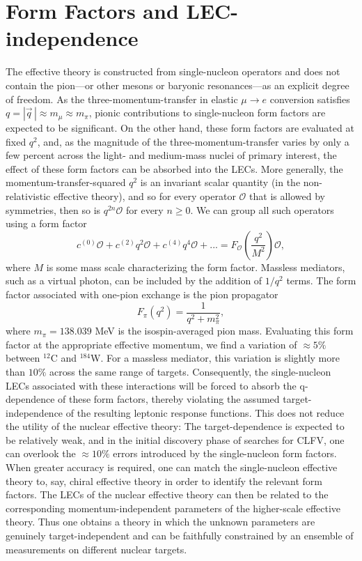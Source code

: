 \documentclass{book}[letterpaper,12pt]
\begin{document}
\section{Form Factors and LEC-independence}
\label{sec:form_factors}
The effective theory is constructed from single-nucleon operators and does not contain the pion---or other mesons or baryonic resonances---as an explicit degree of freedom. As the three-momentum-transfer in elastic $\mu\rightarrow e$ conversion satisfies $q=|\vec{q}\,|\approx m_{\mu}\approx m_{\pi}$, pionic contributions to single-nucleon form factors are expected to be significant. On the other hand, these form factors are evaluated at fixed $q^2$, and, as the magnitude of the three-momentum-transfer varies by only a few percent across the light- and medium-mass nuclei of primary interest, the effect of these form factors can be absorbed into the LECs. More generally, the momentum-transfer-squared $q^2$ is an invariant scalar quantity (in the non-relativistic effective theory), and so for every operator $\mathcal{O}$ that is allowed by symmetries, then so is $q^{2n}\mathcal{O}$ for every $n\geq 0$. We can group all such operators using a form factor
\begin{equation}
c^{(0)}\mathcal{O}+c^{(2)} q^2\mathcal{O}+c^{(4)}q^4\mathcal{O}+...=F_{\mathcal{O}}\left(\frac{q^2}{M^2}\right)\mathcal{O},
\end{equation}
where $M$ is some mass scale characterizing the form factor. Massless mediators, such as a virtual photon, can be included by the addition of $1/q^2$ terms. The form factor associated with one-pion exchange is the pion propagator
\begin{equation}
F_{\pi}(q^2)=\frac{1}{q^2+m_{\pi}^2},
\end{equation}
where $m_{\pi}=138.039$ MeV is the isospin-averaged pion mass. Evaluating this form factor at the appropriate effective momentum, we find a variation of $\approx 5\%$ between $^{12}$C and $^{184}$W. For a massless mediator, this variation is slightly more than $10\%$ across the same range of targets. Consequently, the single-nucleon LECs associated with these interactions will be forced to absorb the q-dependence of these form factors, thereby violating the assumed target-independence of the resulting leptonic response functions. This does not reduce the utility of the nuclear effective theory: The target-dependence is expected to be relatively weak, and in the initial discovery phase of searches for CLFV, one can overlook the $\approx 10 \%$ errors introduced by the single-nucleon form factors. When greater accuracy is required, one can match the single-nucleon effective theory to, say, chiral effective theory in order to identify the relevant form factors. The LECs of the nuclear effective theory can then be related to the corresponding momentum-independent parameters of the higher-scale effective theory. Thus one obtains a theory in which the unknown parameters are genuinely target-independent and can be faithfully constrained by an ensemble of measurements on different nuclear targets. 
\end{document}

